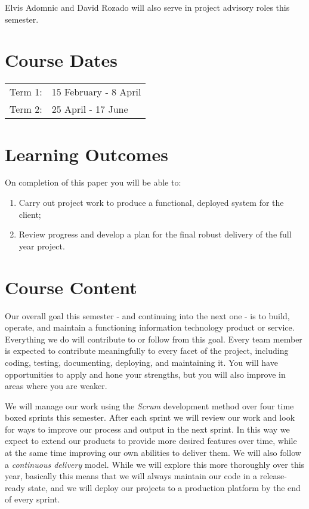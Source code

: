 \documentclass{article}
\begin{document}
\smallskip

\noindent Elvis Adomnic and David Rozado will also serve in project advisory roles this semester.

\section*{Course Dates}
\begin{tabular}{ll}
Term 1:  & 15 February - 8 April\\
Term 2:  & 25 April - 17 June\\
\end{tabular}



\section*{Learning Outcomes}
On completion of this paper you will be able to:
\begin{enumerate}
  \item Carry out project work to produce a functional, deployed system for the client;
  \item Review progress and develop a plan for the final robust delivery of the full year project.
 
\end{enumerate}

\section*{Course Content}
Our overall goal this semester - and continuing into the next one - is to build, operate, and maintain a functioning information technology product or service. Everything we do will contribute to or follow from this goal.  Every team member is expected to contribute meaningfully to every facet of the project, including coding, testing, documenting, deploying, and maintaining it. You will have opportunities to apply and hone your strengths, but you will also improve in areas where you are weaker.

We will manage our work using the \emph{Scrum} development method over four time boxed sprints this semester. After each sprint we will review our work and look for ways to improve our process and output in the next sprint. In this way we expect to extend our products to provide more desired features over time, while at the same time improving our own abilities to deliver them. We will also follow a \emph{continuous delivery} model. While we will explore this more thoroughly over this year, basically this means that we will always maintain our code in a release-ready state, and we will deploy our projects to a production platform by the end of every sprint.
\end{document}
